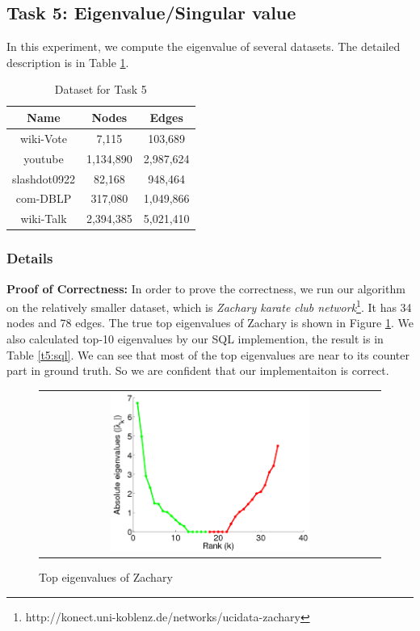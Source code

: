 \subsection{Task 5: Eigenvalue/Singular value}
In this experiment, we compute the eigenvalue of several datasets. The detailed description is in Table \ref{t5:data}.

\begin{table}
\begin{center}
\begin{tabular}{| c | c | c |}
    \hline
    Name & Nodes & Edges \\ \hline
    wiki-Vote & 7,115 & 103,689 \\ \hline
    youtube & 1,134,890 & 2,987,624  \\ \hline
    slashdot0922 & 82,168  & 948,464 \\ \hline
    com-DBLP & 317,080  & 1,049,866 \\ \hline
    wiki-Talk & 2,394,385 & 5,021,410 \\ \hline
\end{tabular}
\end{center}
\caption{Dataset for Task 5}
\label{t5:data}
\end{table}

\subsubsection{Details}
{\bf Proof of Correctness: } In order to prove the correctness, we run our algorithm on the relatively smaller dataset, which is \emph{Zachary karate club network}\footnote{http://konect.uni-koblenz.de/networks/ucidata-zachary}. It has 34 nodes and 78 edges. The true top eigenvalues of Zachary is shown in Figure \ref{t5:zach}. We also calculated top-10 eigenvalues by our SQL implemention, the result is in Table \ref{t5:sql}. We can see that most of the top eigenvalues are near to its counter part in ground truth. So we are confident that our implementaiton is correct.

\begin{figure}[!htbf]
\begin{center}
\begin{tabular}{c}
     \includegraphics[width=0.6\textwidth]{FIG/t5_zach.png}\\
\end{tabular}
\caption{Top eigenvalues of Zachary}
\label{t5:zach}
\end{center}
\end{figure}

